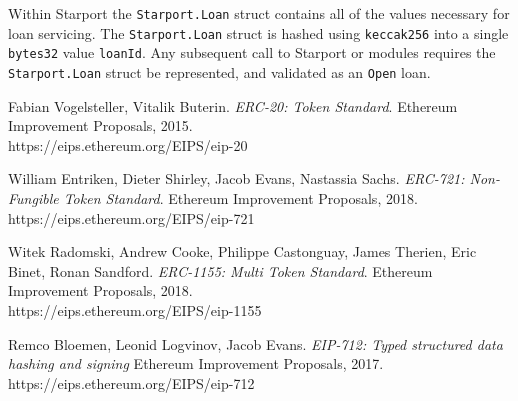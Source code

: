 \documentclass[12pt]{article}
\begin{document}
Within Starport the \texttt{Starport.Loan} struct contains all of the values necessary for loan servicing. The \texttt{Starport.Loan} struct is hashed using \texttt{keccak256} into a single \texttt{bytes32} value \texttt{loanId}.
Any subsequent call to Starport or modules requires the \texttt{Starport.Loan} struct be represented, and validated as an \texttt{Open} loan.


\begin{thebibliography}{9}
Fabian Vogelsteller, Vitalik Buterin. 
\textit{ERC-20: Token Standard}. 
Ethereum Improvement Proposals, 2015.\\
https://eips.ethereum.org/EIPS/eip-20

 William Entriken, Dieter Shirley, Jacob Evans, Nastassia Sachs. 
\textit{ERC-721: Non-Fungible Token Standard}. 
Ethereum Improvement Proposals, 2018.\\
https://eips.ethereum.org/EIPS/eip-721

Witek Radomski, Andrew Cooke, Philippe Castonguay, James Therien, Eric Binet, Ronan Sandford. 
\textit{ERC-1155: Multi Token Standard}. 
Ethereum Improvement Proposals, 2018.\\
https://eips.ethereum.org/EIPS/eip-1155

Remco Bloemen, Leonid Logvinov, Jacob Evans.
\textit{EIP-712: Typed structured data hashing and signing} 
Ethereum Improvement Proposals, 2017.\\
https://eips.ethereum.org/EIPS/eip-712

\end{thebibliography}
\end{document}
